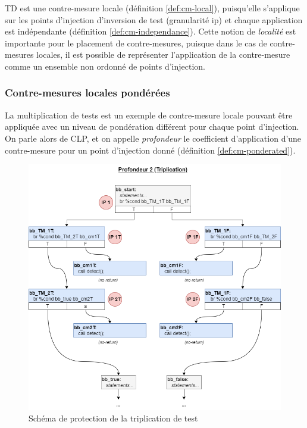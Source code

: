                 \gls{TD} est une contre-mesure locale (définition \ref{def:cm-local}), puisqu'elle s'applique sur les points d'injection d'inversion de test (granularité \gls{ip}) et chaque application est indépendante (définition \ref{def:cm-independance}).
                Cette notion de \textit{localité} est importante pour le placement de contre-mesures, puisque dans le cas de contre-mesures locales, il est possible de représenter l'application de la contre-mesure comme un ensemble non ordonné de points d'injection.
                
            \subsubsection{Contre-mesures locales pondérées}
            \label{sec:cm-ponderated}
    
                La multiplication de tests est un exemple de contre-mesure locale pouvant être appliquée avec un niveau de pondération différent pour chaque point d'injection.
                On parle alors de \gls{CLP}, et on appelle \textit{profondeur} le coefficient d'application d'une contre-mesure pour un point d'injection donné (définition \ref{def:cm-ponderated}).
                
                \begin{figure}[p]\centering
                    \includegraphics[scale=0.45]{ch5-placement/img/cm-mul-tripl.png}
                    \caption{Schéma de protection de la triplication de test}
                    \label{fig:tt-scheme}
                \end{figure}
            
